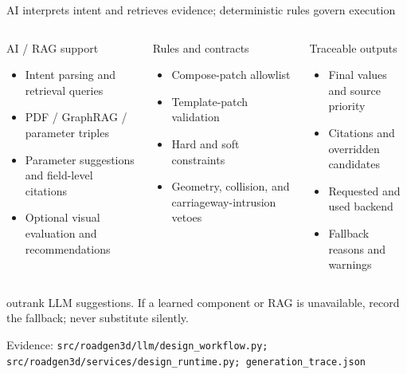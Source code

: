 \documentclass[aspectratio=169,10pt]{ctexbeamer}
\newcommand{\sourcefoot}[1]{\vfill{\tiny\color{hkustgrey}Evidence: \texttt{#1}}}
\begin{document}
\begin{frame}{AI interprets intent and retrieves evidence; deterministic rules govern execution}
  \footnotesize
  \begin{columns}[T,onlytextwidth]
      \begin{block}{AI / RAG support}
        \begin{itemize}
          \item Intent parsing and retrieval queries
          \item PDF / GraphRAG / parameter triples
          \item Parameter suggestions and field-level citations
          \item Optional visual evaluation and recommendations
        \end{itemize}
      \end{block}
      \begin{alertblock}{Rules and contracts}
        \begin{itemize}
          \item Compose-patch allowlist
          \item Template-patch validation
          \item Hard and soft constraints
          \item Geometry, collision, and carriageway-intrusion vetoes
        \end{itemize}
      \end{alertblock}
      \begin{exampleblock}{Traceable outputs}
        \begin{itemize}
          \item Final values and source priority
          \item Citations and overridden candidates
          \item Requested and used backend
          \item Fallback reasons and warnings
        \end{itemize}
      \end{exampleblock}
  \end{columns}
  \tightgap
  \begin{callout}
     outrank LLM suggestions. If a learned component or RAG is unavailable, record the fallback; never substitute silently.
  \end{callout}
  \sourcefoot{src/roadgen3d/llm/design\_workflow.py; src/roadgen3d/services/design\_runtime.py; generation\_trace.json}
\end{frame}
\end{document}
